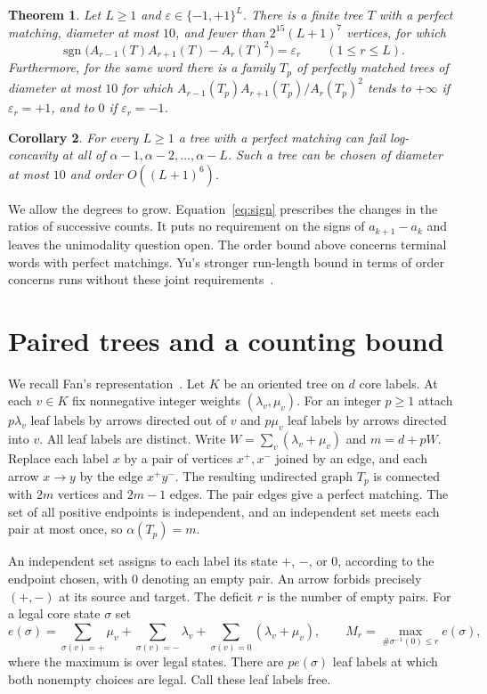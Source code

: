 \documentclass[11pt]{article}
\newtheorem{theorem}{Theorem}[section]
\newtheorem{corollary}[theorem]{Corollary}
\theoremstyle{definition}\newtheorem{example}[theorem]{Example}
\newcommand{\sig}{\operatorname{sgn}}
\begin{document}
\begin{theorem}\label{thm:main}
Let $L\ge1$ and $\varepsilon\in\{-1,+1\}^{L}$. There is a finite tree $T$ with a perfect matching, diameter at most $10$, and fewer than $2^{15}(L+1)^7$ vertices, for which
\begin{equation}\label{eq:sign}
 \sig\big(A_{r-1}(T)A_{r+1}(T)-A_r(T)^2\big)=\varepsilon_r\qquad(1\le r\le L).
\end{equation}
Furthermore, for the same word there is a family $T_p$ of perfectly matched trees of diameter at most $10$ for which $A_{r-1}(T_p)A_{r+1}(T_p)/A_r(T_p)^2$ tends to $+\infty$ if $\varepsilon_r=+1$, and to $0$ if $\varepsilon_r=-1$.
\end{theorem}

\begin{corollary}\label{cor:run}
For every $L\ge1$ a tree with a perfect matching can fail log-concavity at all of $\alpha-1,\alpha-2,\ldots,\alpha-L$. Such a tree can be chosen of diameter at most $10$ and order $O((L+1)^6)$.
\end{corollary}

We allow the degrees to grow. Equation~\eqref{eq:sign} prescribes the changes in the ratios of successive counts. It puts no requirement on the signs of $a_{k+1}-a_k$ and leaves the unimodality question open. The order bound above concerns terminal words with perfect matchings. Yu's stronger run-length bound in terms of order concerns runs without these joint requirements~\cite{yu}.

\section{Paired trees and a counting bound}
We recall Fan's representation~\cite[Sections 2 and 6]{fan}. Let $K$ be an oriented tree on $d$ core labels. At each $v\in K$ fix nonnegative integer weights $(\lambda_v,\mu_v)$. For an integer $p\ge1$ attach $p\lambda_v$ leaf labels by arrows directed out of $v$ and $p\mu_v$ leaf labels by arrows directed into $v$. All leaf labels are distinct. Write $W=\sum_v(\lambda_v+\mu_v)$ and $m=d+pW$. Replace each label $x$ by a pair of vertices $x^+,x^-$ joined by an edge, and each arrow $x\to y$ by the edge $x^+y^-$. The resulting undirected graph $T_p$ is connected with $2m$ vertices and $2m-1$ edges. The pair edges give a perfect matching. The set of all positive endpoints is independent, and an independent set meets each pair at most once, so $\alpha(T_p)=m$.

An independent set assigns to each label its state $+$, $-$, or $0$, according to the endpoint chosen, with $0$ denoting an empty pair. An arrow forbids precisely $(+,-)$ at its source and target. The deficit $r$ is the number of empty pairs. For a legal core state $\sigma$ set
\[
 e(\sigma)=\sum_{\sigma(v)=+}\mu_v+\sum_{\sigma(v)=-}\lambda_v+
                   \sum_{\sigma(v)=0}(\lambda_v+\mu_v),\qquad
 M_r=\max_{\#\sigma^{-1}(0)\le r}e(\sigma),
\]
where the maximum is over legal states. There are $p e(\sigma)$ leaf labels at which both nonempty choices are legal. Call these leaf labels free.
\end{document}
